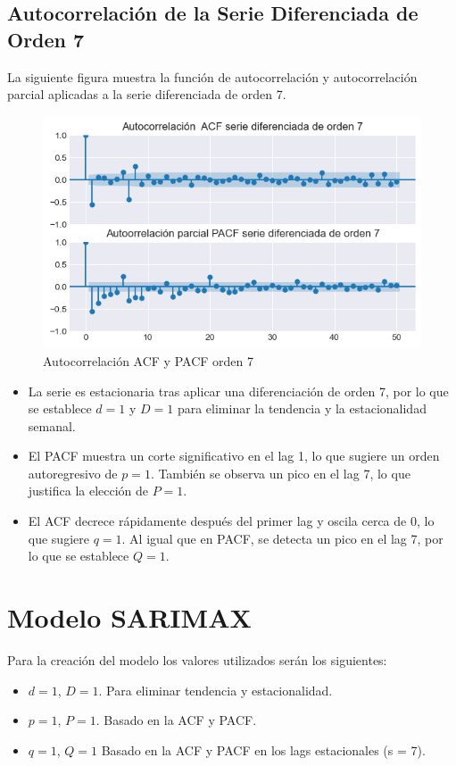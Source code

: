 \subsection{Autocorrelación de la Serie Diferenciada de Orden 7}
La siguiente figura muestra la función de autocorrelación y autocorrelación parcial aplicadas a la serie diferenciada de orden 7. 

\begin{figure}[h]
	\centering
	\includegraphics[width=0.7\linewidth]{dif7_autocorrelacion_PACF_ACF}
	\caption{Autocorrelación ACF y PACF orden 7}
	\label{fig:dif7autocorrelacionpacfacf}
\end{figure}

\begin{itemize}
\item La serie es estacionaria tras aplicar una diferenciación de orden 7, por lo que se establece $d = 1$ y $D = 1$ para eliminar la tendencia y la estacionalidad semanal.
\item El PACF muestra un corte significativo en el lag 1, lo que sugiere un orden autoregresivo de $p = 1$. También se observa un pico en el lag 7, lo que justifica la elección de $P = 1$.
\item El ACF decrece rápidamente después del primer lag y oscila cerca de 0, lo que sugiere $q = 1$. Al igual que en PACF, se detecta un pico en el lag 7, por lo que se establece $Q = 1$.
\end{itemize}

\section{Modelo SARIMAX}

Para la creación del modelo los valores utilizados serán los siguientes:
\begin{itemize}
	\item $d = 1$, $D = 1$. Para eliminar tendencia y estacionalidad.
	\item $p = 1$, $P = 1$. Basado en la ACF y PACF.
	\item $q = 1$, $Q = 1$ Basado en la ACF y PACF en los lags estacionales (s = 7).
\end{itemize}

